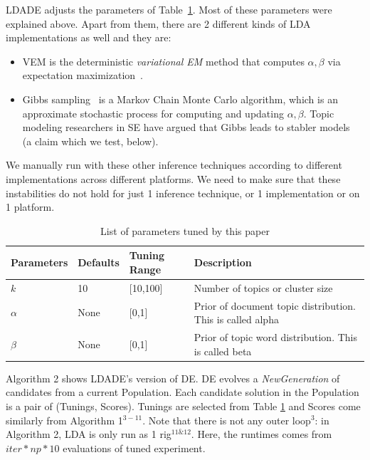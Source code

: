 \documentclass[twocolumn,5p,sort&compress]{elsarticle}
\newcommand{\bi}{\begin{itemize}}
\newcommand{\ei}{\end{itemize}}
\theoremstyle{break}
\begin{document}
LDADE  adjusts the parameters of
Table~\ref{tb:tuned}. Most of these parameters were explained above. Apart from them, there are 2 different kinds of LDA implementations as well and they are:
\bi
\item VEM is the deterministic {\em variational EM} method that computes $\alpha,\beta$ via
  expectation maximization~\cite{minka2002expectation}.
\item Gibbs sampling~\cite{wei2006lda, griffiths2004finding} is a Markov Chain Monte Carlo algorithm, which is an approximate stochastic process for computing and updating $\alpha,\beta$.
  Topic modeling researchers in SE have argued that Gibbs leads to stabler models~\cite{layman16a,layman2016topic} (a claim which we test, below).
  \ei

We manually run with these other inference techniques according to different implementations across different platforms. We need to make sure that these instabilities do not hold for just 1 inference technique, or 1 implementation or on 1 platform.

\begin{table}[!htbp]
    \begin{center}
\scriptsize
\begin{tabular}{|l|l|l|p{3.5cm}|}
        \hline 
        \textbf{Parameters} & \textbf{Defaults} & \textbf{Tuning Range} & \textbf{Description}\\
        \hline
        $k$ & 10 & [10,100] & Number of topics or cluster size \\ 
        \hline
       $\alpha$ & None & [0,1] & Prior of document topic distribution. This is called alpha \\ 
        \hline
        $\beta$ & None & [0,1] & Prior of topic word distribution. This is called  beta \\

        \hline
\end{tabular}

\end{center}
\caption{List of parameters tuned by this paper}
\label{tb:tuned}
\end{table}

Algorithm 2 shows LDADE's version of DE.  DE evolves a \textit{NewGeneration} of
candidates from a current Population.   Each candidate solution in the Population is a pair of
(Tunings, Scores). Tunings are selected from Table \ref{tb:tuned} and Scores
come similarly from Algorithm 1$^{3-11}$. Note that there is not any outer loop$^{3}$: in Algorithm 2, LDA is only run as 1 rig$^{11 \& 12}$. Here, the runtimes comes from $\mathit{iter} * np * 10$ evaluations of tuned experiment.
\end{document}
